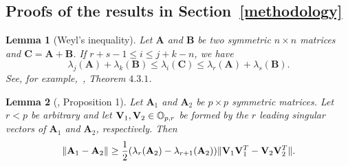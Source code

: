 \documentclass[3p]{elsarticle}
\newcommand{\BA}{\mathbf{A}}    \newcommand{\BB}{\mathbf{B}}    \newcommand{\BC}{\mathbf{C}}    \newcommand{\BD}{\mathbf{D}}    \newcommand{\BE}{\mathbf{E}}    \newcommand{\BF}{\mathbf{F}}    \newcommand{\BG}{\mathbf{G}}    \newcommand{\BH}{\mathbf{H}}    \newcommand{\BI}{\mathbf{I}}    \newcommand{\BJ}{\mathbf{J}}    \newcommand{\BK}{\mathbf{K}}    \newcommand{\BL}{\mathbf{L}}
\theoremstyle{plain}
\newtheorem{corollary}{\quad\quad Corollary}
\newtheorem{lemma}{\quad\quad Lemma}
\theoremstyle{definition}
\theoremstyle{remark}
\begin{document}
\begin{appendices}
\section{Proofs of the results in Section~\ref{methodology}}\label{appendixB}

\begin{lemma}[Weyl's inequality]
Let $\BA$ and $\BB$ be two symmetric $n\times n$ matrices and $\BC=\BA+\BB$. If $r+s-1 \leq  i\leq j+k-n$, we have
\begin{equation*}
\lambda_j(\BA)+\lambda_k(\BB)\leq \lambda_i(\BC) \leq \lambda_r(\BA)+\lambda_s(\BB).
\end{equation*}
    See, for example,~\cite{Horn1985Matrix}, Theorem $4.3.1$.
\end{lemma}

\begin{lemma}[\cite{Cai2015Optimal}, Proposition 1]\label{pert}
    Let $\BA_1$ and $\BA_2$ be $p\times p$ symmetric matrices. Let $r<p$ be arbitrary and let $\mathbf{V}_1, \mathbf{V}_2\in \mathbb{O}_{p,r}$ be formed by the $r$ leading singular vectors of $\BA_1$ and $\BA_2$, respectively.
    Then
    $$
    \|\BA_1-\BA_2\|\geq \frac{1}{2}(\lambda_r(\BA_2)-\lambda_{r+1}(\BA_2))\|\BV_1 \BV_1^T- \BV_2 \BV_2^T\|.
    $$
\end{lemma}



\end{appendices}
\end{document}
